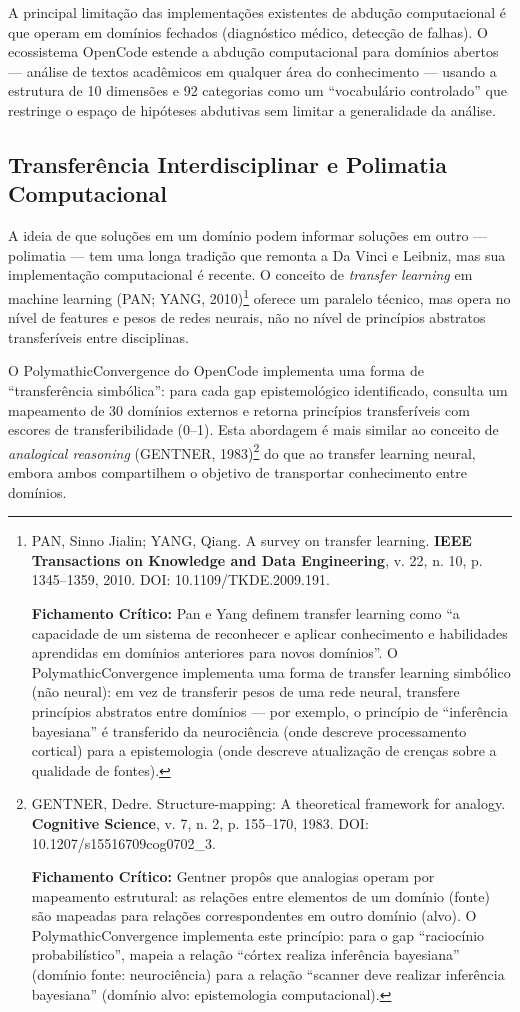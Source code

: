 A principal limitação das implementações existentes de abdução computacional é que operam em domínios fechados (diagnóstico médico, detecção de falhas). O ecossistema OpenCode estende a abdução computacional para domínios abertos --- análise de textos acadêmicos em qualquer área do conhecimento --- usando a estrutura de 10 dimensões e 92 categorias como um ``vocabulário controlado'' que restringe o espaço de hipóteses abdutivas sem limitar a generalidade da análise.

\subsection{Transferência Interdisciplinar e Polimatia Computacional}

A ideia de que soluções em um domínio podem informar soluções em outro --- polimatia --- tem uma longa tradição que remonta a Da Vinci e Leibniz, mas sua implementação computacional é recente. O conceito de \textit{transfer learning} em machine learning (PAN; YANG, 2010)\footnote{
  PAN, Sinno Jialin; YANG, Qiang. A survey on transfer learning. \textbf{IEEE Transactions on Knowledge and Data Engineering}, v. 22, n. 10, p. 1345--1359, 2010. DOI: 10.1109/TKDE.2009.191.

  \textbf{Fichamento Crítico:} Pan e Yang definem transfer learning como ``a capacidade de um sistema de reconhecer e aplicar conhecimento e habilidades aprendidas em domínios anteriores para novos domínios''. O PolymathicConvergence implementa uma forma de transfer learning simbólico (não neural): em vez de transferir pesos de uma rede neural, transfere princípios abstratos entre domínios --- por exemplo, o princípio de ``inferência bayesiana'' é transferido da neurociência (onde descreve processamento cortical) para a epistemologia (onde descreve atualização de crenças sobre a qualidade de fontes).
} oferece um paralelo técnico, mas opera no nível de features e pesos de redes neurais, não no nível de princípios abstratos transferíveis entre disciplinas.

O PolymathicConvergence do OpenCode implementa uma forma de ``transferência simbólica'': para cada gap epistemológico identificado, consulta um mapeamento de 30 domínios externos e retorna princípios transferíveis com escores de transferibilidade (0--1). Esta abordagem é mais similar ao conceito de \textit{analogical reasoning} (GENTNER, 1983)\footnote{
  GENTNER, Dedre. Structure-mapping: A theoretical framework for analogy. \textbf{Cognitive Science}, v. 7, n. 2, p. 155--170, 1983. DOI: 10.1207/s15516709cog0702\_3.

  \textbf{Fichamento Crítico:} Gentner propôs que analogias operam por mapeamento estrutural: as relações entre elementos de um domínio (fonte) são mapeadas para relações correspondentes em outro domínio (alvo). O PolymathicConvergence implementa este princípio: para o gap ``raciocínio probabilístico'', mapeia a relação ``córtex realiza inferência bayesiana'' (domínio fonte: neurociência) para a relação ``scanner deve realizar inferência bayesiana'' (domínio alvo: epistemologia computacional).
} do que ao transfer learning neural, embora ambos compartilhem o objetivo de transportar conhecimento entre domínios.

\newpage
